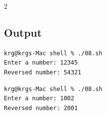 \documentclass[a4paper,12pt]{article}
\begin{document}
\begin{multicols}{2}
\subsection*{Output}
\begin{lstlisting}[style=outputstyle]
krg@krgs-Mac shell % ./08.sh
Enter a number: 12345
Reversed number: 54321
\end{lstlisting}
\begin{lstlisting}[style=outputstyle]
krg@krgs-Mac shell % ./08.sh
Enter a number: 1002
Reversed number: 2001
\end{lstlisting}

\end{multicols}
\newpage

\end{document}
